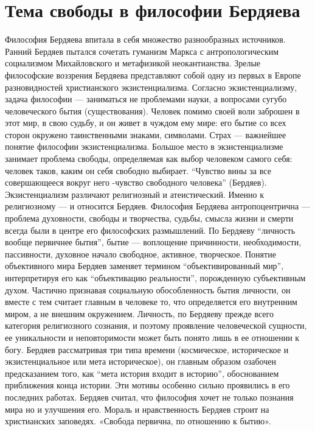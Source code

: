 \documentclass[12pt]{article}
\begin{document}
\section{Тема свободы в философии Бердяева}
Философия Бердяева впитала в себя множество разнообразных источников. Ранний Бердяев пытался сочетать
гуманизм Маркса с антропологическим социализмом Михайловского и метафизикой неокантианства. Зрелые
философские воззрения Бердяева представляют собой одну из первых в Европе разновидностей христианского
экзистенциализма.  Согласно  экзистенциализму,  задача  философии  ---  заниматься  не  проблемами  науки,  а
вопросами сугубо человеческого бытия (существования). Человек помимо своей воли заброшен в этот мир, в
свою судьбу, и он живет в чуждом ему мире: его бытие со всех сторон окружено таинственными знаками,
символами. Страх --- важнейшее понятие философии экзистенциализма. 
Большое место в экзистенциализме занимает проблема свободы, определяемая как выбор человеком самого
себя: человек таков, каким он себя свободно выбирает. “Чувство вины за все совершающееся вокруг него -чувство свободного человека” (Бердяев).
Экзистенциализм различают религиозный и атеистический. Именно к религиозному --- и относится Бердяев.
Философия Бердяева антропоцентрична --- проблема духовности, свободы и творчества, судьбы, смысла жизни и
смерти всегда были в центре его философских размышлений. По Бердяеву “личность вообще первичнее бытия”,
бытие  ---  воплощение  причинности,  необходимости,  пассивности,  духовное  начало  свободное,  активное,
творческое. Понятие объективного мира Бердяев заменяет термином “объективированный мир”, интерпретируя
его  как  “объективацию  реальности”,  порожденную  субъективным  духом.  Частично  признавая  социальную
обособленность  бытия  личности,  он  вместе  с  тем  считает  главным  в  человеке  то,  что  определяется  его
внутренним миром, а не внешним окружением. Личность, по Бердяеву прежде всего категория религиозного
сознания,  и  поэтому  проявление  человеческой  сущности,  ее  уникальности  и  неповторимости  может  быть
понято лишь в ее отношении к богу.
Бердяев  рассматривая  три  типа  времени  (космическое,  историческое  и  экзистенциальное  или  мета
историческое),  он  главным  образом  озабочен  предсказанием  того,  как  “мета  история  входит  в  историю”,
обоснованием приближения конца истории. Эти мотивы особенно сильно проявились в его последних работах.
Бердяев считал, что философия хочет не только познания мира но и улучшения его. Мораль и нравственность
Бердяев строит на христианских заповедях.
«Свобода первична, по отношению к бытию». 
\end{document}
